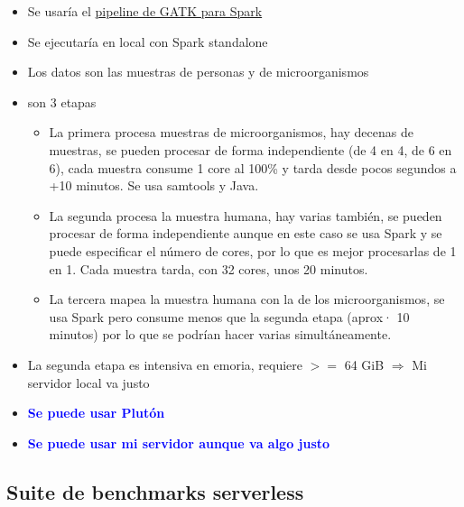 \documentclass[preprint,3p]{elsarticle}
\begin{document}
\begin{itemize}
	\item Se usaría el \href{https://gatk.broadinstitute.org/hc/en-us/articles/13832627644443-PathSeqPipelineSpark}{pipeline de GATK para Spark}
	\item Se ejecutaría en local con Spark standalone
	\item Los datos son las muestras de personas y de microorganismos
	\item son 3 etapas
	\begin{itemize}
		\item La primera procesa muestras de microorganismos, hay decenas de muestras, se pueden procesar de forma independiente (de 4 en 4, de 6 en 6), cada muestra consume 1 core al 100\% y tarda desde pocos segundos a +10 minutos. Se usa samtools y Java.
		\item La segunda procesa la muestra humana, hay varias también, se pueden procesar de forma independiente aunque en este caso se usa Spark y se puede especificar el número de cores, por lo que es mejor procesarlas de 1 en 1. Cada muestra tarda, con 32 cores, unos 20 minutos.
		\item La tercera mapea la muestra humana con la de los microorganismos, se usa Spark pero consume menos que la segunda etapa (aprox· 10 minutos) por lo que se podrían hacer varias simultáneamente.
	\end{itemize}
	\item La segunda etapa es intensiva en emoria, requiere $>=$ 64 GiB $\Rightarrow$ Mi servidor local va justo
	\item \textcolor{blue}{\textbf{Se puede usar Plutón}}
	\item \textcolor{blue}{\textbf{Se puede usar mi servidor aunque va algo justo}}
\end{itemize}

\subsection{Suite de benchmarks serverless}
\end{document}
